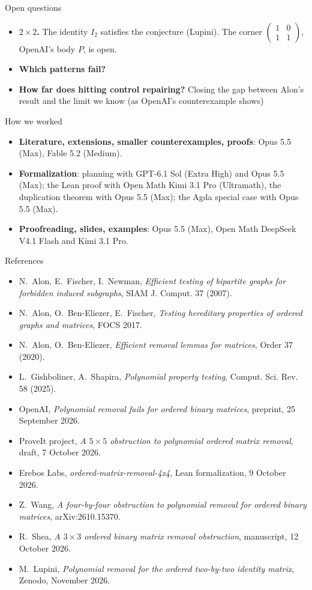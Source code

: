 \documentclass[aspectratio=169,11pt,t]{beamer}
\newcommand{\smallmat}[1]{\left(\begin{smallmatrix}#1\end{smallmatrix}\right)}
\begin{document}
\begin{frame}{Open questions}
\begin{itemize}
\item \textbf{$2\times2$.} The identity $I_2$ satisfies the conjecture (Lupini). The corner $\smallmat{1&0\\1&1}$, OpenAI's body $P$, is open. 
\item \textbf{Which patterns fail?}
\item \textbf{How far does hitting control repairing?} Closing the gap between Alon's result and the limit we know (as OpenAI's counterexample shows)
\end{itemize}
\end{frame}

\begin{frame}{How we worked}
\small
\begin{itemize}
\item \textbf{Literature, extensions, smaller counterexamples, proofs}: Opus 5.5 (Max), Fable 5.2 (Medium).
\item \textbf{Formalization}: planning with GPT-6.1 Sol (Extra High) and Opus 5.5 (Max); the Lean proof with Open Math Kimi 3.1 Pro (Ultramath), the duplication theorem with Opus 5.5 (Max); the Agda special case with Opus 5.5 (Max).
\item \textbf{Proofreading, slides, examples}: Opus 5.5 (Max), Open Math DeepSeek V4.1 Flash and Kimi 3.1 Pro.
\end{itemize}
\end{frame}

\begin{frame}{References}
\scriptsize
\begin{itemize}
\item N.~Alon, E.~Fischer, I.~Newman, \emph{Efficient testing of bipartite graphs for forbidden induced subgraphs}, SIAM J. Comput. 37 (2007).
\item N.~Alon, O.~Ben-Eliezer, E.~Fischer, \emph{Testing hereditary properties of ordered graphs and matrices}, FOCS 2017.
\item N.~Alon, O.~Ben-Eliezer, \emph{Efficient removal lemmas for matrices}, Order 37 (2020).
\item L.~Gishboliner, A.~Shapira, \emph{Polynomial property testing}, Comput. Sci. Rev. 58 (2025).
\item OpenAI, \emph{Polynomial removal fails for ordered binary matrices}, preprint, 25 September 2026.
\item ProveIt project, \emph{A $5\times5$ obstruction to polynomial ordered matrix removal}, draft, 7 October 2026.
\item Erebos Labs, \emph{ordered-matrix-removal-4x4}, Lean formalization, 9 October 2026.
\item Z.~Wang, \emph{A four-by-four obstruction to polynomial removal for ordered binary matrices}, arXiv:2610.15370.
\item R.~Shea, \emph{A $3\times3$ ordered binary matrix removal obstruction}, manuscript, 12 October 2026.
\item M.~Lupini, \emph{Polynomial removal for the ordered two-by-two identity matrix}, Zenodo, November 2026.
\end{itemize}
\end{frame}
\end{document}

